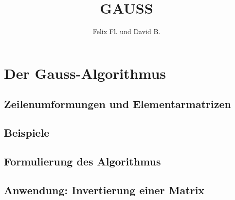 \documentclass{scrartcl}
\title{GAUSS}
\author{Felix Fl. und David B.}
\begin{document}
\maketitle

\tableofcontents
\newpage

\section{Der Gauss-Algorithmus}

\subsection{Zeilenumformungen und Elementarmatrizen}


\subsection{Beispiele}


\subsection{Formulierung des Algorithmus}
\subsection{Anwendung: Invertierung einer Matrix}

\end{document}
